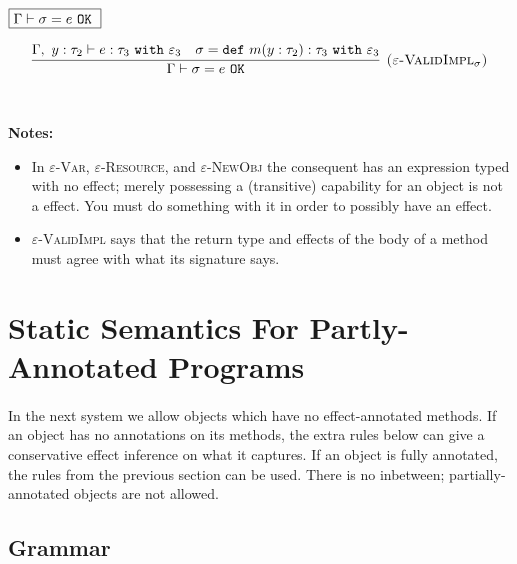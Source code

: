 \documentclass{llncs}
\newcommand{\keywadj}[1]{\mathtt{#1}}
\newcommand{\keyw}[1]{\keywadj{#1}~}
\begin{document}
$\fbox{$\Gamma \vdash \sigma = e~\keyw{OK}$}$

\[
\begin{array}{c}
\infer[\textsc{($\varepsilon$-ValidImpl$_\sigma$)}]
	{\Gamma \vdash \sigma = e~\keywadj{OK}}
	{\Gamma,~y:\tau_2 \vdash e: \tau_3~\keyw{with} \varepsilon_3 & \sigma = \keyw{def} m(y:\tau_2):\tau_3~\keyw{with} \varepsilon_3} \\[5ex]
\end{array}
\]

\noindent \textbf{Notes:}

\begin{itemize}
	\item In \textsc{$\varepsilon$-Var}, \textsc{$\varepsilon$-Resource}, and \textsc{$\varepsilon$-NewObj} the consequent has an expression typed with no effect; merely possessing a (transitive) capability for an object is not a effect. You must do something with it in order to possibly have an effect.
	\item \textsc{$\varepsilon$-ValidImpl} says that the return type and effects of the body of a method must agree with what its signature says.
\end{itemize}




\newpage

\section{Static Semantics For Partly-Annotated Programs}

\paragraph{}
In the next system we allow objects which have no effect-annotated methods. If an object has no annotations on its methods, the extra rules below can give a conservative effect inference on what it captures. If an object is fully annotated, the rules from the previous section can be used. There is no inbetween; partially-annotated objects are not allowed.

\subsection{Grammar}
\end{document}
